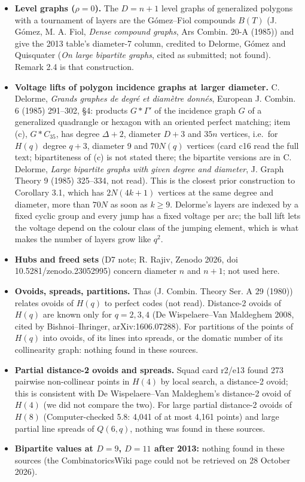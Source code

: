 \documentclass[
  10pt,
]{article}
\providecommand{\tightlist}{%
  \setlength{\itemsep}{0pt}\setlength{\parskip}{0pt}}
\begin{document}
\begin{itemize}
\tightlist
\item
  \textbf{Level graphs (\(\rho = 0\)).} The \(D = n+1\) level graphs of
  generalized polygons with a tournament of layers are the Gómez--Fiol
  compounds \(B(T)\) (J. Gómez, M. A. Fiol, \emph{Dense compound
  graphs}, Ars Combin. 20-A (1985)) and give the 2013 table's diameter-7
  column, credited to Delorme, Gómez and Quisquater (\emph{On large
  bipartite graphs}, cited as submitted; not found). Remark 2.4 is that
  construction.
\item
  \textbf{Voltage lifts of polygon incidence graphs at larger diameter.}
  C. Delorme, \emph{Grands graphes de degré et diamètre donnés},
  European J. Combin. 6 (1985) 291--302, §4: products \(G*\Gamma'\) of
  the incidence graph \(G\) of a generalized quadrangle or hexagon with
  an oriented perfect matching; item (c), \(G*C_{35}\), has degree
  \(\Delta+2\), diameter \(D+3\) and \(35n\) vertices, i.e.~for \(H(q)\)
  degree \(q+3\), diameter 9 and \(70N(q)\) vertices (card c16 read the
  full text; bipartiteness of (c) is not stated there; the bipartite
  versions are in C. Delorme, \emph{Large bipartite graphs with given
  degree and diameter}, J. Graph Theory 9 (1985) 325--334, not read).
  This is the closest prior construction to Corollary 3.1, which has
  \(2N(4k+1)\) vertices at the same degree and diameter, more than
  \(70N\) as soon as \(k\ge 9\). Delorme's layers are indexed by a fixed
  cyclic group and every jump has a fixed voltage per arc; the ball lift
  lets the voltage depend on the colour class of the jumping element,
  which is what makes the number of layers grow like \(q^2\).
\item
  \textbf{Hubs and freed sets} (D7 note; R. Rajiv, Zenodo 2026, doi
  10.5281/zenodo.23052995) concern diameter \(n\) and \(n+1\); not used
  here.
\item
  \textbf{Ovoids, spreads, partitions.} Thas (J. Combin. Theory Ser. A
  29 (1980)) relates ovoids of \(H(q)\) to perfect codes (not read).
  Distance-2 ovoids of \(H(q)\) are known only for \(q = 2, 3, 4\) (De
  Wispelaere--Van Maldeghem 2008, cited by Bishnoi--Ihringer,
  arXiv:1606.07288). For partitions of the points of \(H(q)\) into
  ovoids, of its lines into spreads, or the domatic number of its
  collinearity graph: nothing found in these sources.
\item
  \textbf{Partial distance-2 ovoids and spreads.} Squad card r2/e13
  found 273 pairwise non-collinear points in \(H(4)\) by local search, a
  distance-2 ovoid; this is consistent with De Wispelaere--Van
  Maldeghem's distance-2 ovoid of \(H(4)\) (we did not compare the two).
  For large partial distance-2 ovoids of \(H(8)\) (Computer-checked 5.8:
  4,041 of at most 4,161 points) and large partial line spreads of
  \(Q(6,q)\), nothing was found in these sources.
\item
  \textbf{Bipartite values at \(D = 9\), \(D = 11\) after 2013:} nothing
  found in these sources (the CombinatoricsWiki page could not be
  retrieved on 28 October 2026).
\end{itemize}
\end{document}

